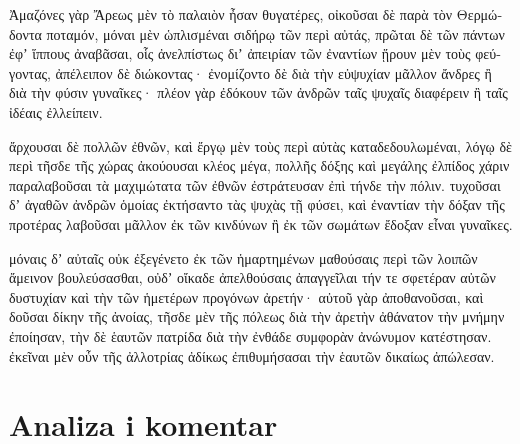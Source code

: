 \medskip


{\large

\begin{greek}

\noindent Ἀμαζόνες γὰρ Ἄρεως μὲν τὸ παλαιὸν ἦσαν θυγατέρες, οἰκοῦσαι δὲ παρὰ τὸν Θερμώδοντα ποταμόν, μόναι μὲν ὡπλισμέναι σιδήρῳ τῶν περὶ αὐτάς, πρῶται δὲ τῶν πάντων ἐφʼ ἵππους ἀναβᾶσαι, οἷς ἀνελπίστως διʼ ἀπειρίαν τῶν ἐναντίων ᾕρουν μὲν τοὺς φεύγοντας, ἀπέλειπον δὲ διώκοντας· ἐνομίζοντο δὲ διὰ τὴν εὐψυχίαν μᾶλλον ἄνδρες ἢ διὰ τὴν φύσιν γυναῖκες· πλέον γὰρ ἐδόκουν τῶν ἀνδρῶν ταῖς ψυχαῖς διαφέρειν ἢ ταῖς ἰδέαις ἐλλείπειν.

ἄρχουσαι δὲ πολλῶν ἐθνῶν, καὶ ἔργῳ μὲν τοὺς περὶ αὐτὰς καταδεδουλωμέναι, λόγῳ δὲ περὶ τῆσδε τῆς χώρας ἀκούουσαι κλέος μέγα, πολλῆς δόξης καὶ μεγάλης ἐλπίδος χάριν παραλαβοῦσαι τὰ μαχιμώτατα τῶν ἐθνῶν ἐστράτευσαν ἐπὶ τήνδε τὴν πόλιν. τυχοῦσαι δʼ ἀγαθῶν ἀνδρῶν ὁμοίας ἐκτήσαντο τὰς ψυχὰς τῇ φύσει, καὶ ἐναντίαν τὴν δόξαν τῆς προτέρας λαβοῦσαι μᾶλλον ἐκ τῶν κινδύνων ἢ ἐκ τῶν σωμάτων ἔδοξαν εἶναι γυναῖκες.

μόναις δʼ αὐταῖς οὐκ ἐξεγένετο ἐκ τῶν ἡμαρτημένων μαθούσαις περὶ τῶν λοιπῶν ἄμεινον βουλεύσασθαι, οὐδʼ οἴκαδε ἀπελθούσαις ἀπαγγεῖλαι τήν τε σφετέραν αὐτῶν δυστυχίαν καὶ τὴν τῶν ἡμετέρων προγόνων ἀρετήν· αὐτοῦ γὰρ ἀποθανοῦσαι, καὶ δοῦσαι δίκην τῆς ἀνοίας, τῆσδε μὲν τῆς πόλεως διὰ τὴν ἀρετὴν ἀθάνατον τὴν μνήμην ἐποίησαν, τὴν δὲ ἑαυτῶν πατρίδα διὰ τὴν ἐνθάδε συμφορὰν ἀνώνυμον κατέστησαν. ἐκεῖναι μὲν οὖν τῆς ἀλλοτρίας ἀδίκως ἐπιθυμήσασαι τὴν ἑαυτῶν δικαίως ἀπώλεσαν.

\end{greek}

}

\newpage

\section*{Analiza i komentar}


